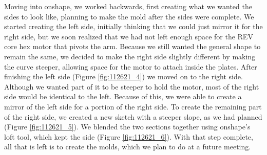 Moving into onshape, we worked backwards, first creating what we wanted the sides to look like, planning to make the mold after the sides were  complete.  We started creating the left side, initially thinking that we could just mirror it for the right side, but we soon realized that we had not left enough space for the REV core hex motor that pivots the arm.  Because we still wanted the general shape to remain the same, we decided to make the right side slightly different by making the curve steeper, allowing space for the motor to attach inside the plates.  After finishing the left side (Figure \ref{fig:112621_4}) we moved on to the right side.  Although we wanted part of it to be steeper to hold the motor, most of the right side would be identical to the left.  Because of this, we were able to create a mirror of the left side for a portion of the right side. To create the remaining part of the right side, we created a new sketch with a steeper slope, as we had planned (Figure \ref{fig:112621_5}). We blended the two sections together using onshape’s loft tool, which kept the side (Figure \ref{fig:112621_6}).  With that step complete, all that is left is to create the molds, which we plan to do at a future meeting.

 

